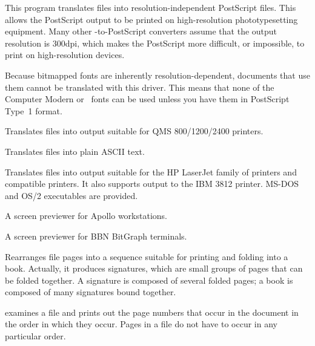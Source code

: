 
This program translates  files into resolution-independent 
PostScript files.  This allows the PostScript output to be printed on
high-resolution phototypesetting equipment.  Many other 
-to-PostScript converters assume that the output resolution is 
300dpi, which makes the PostScript more difficult, or impossible, to print
on high-resolution devices.

Because bitmapped fonts are inherently resolution-dependent, documents
that use them cannot be translated with this driver.  This means
that none of the Computer Modern or \AmS\ fonts can be used unless
you have them in PostScript Type~1 format.


Translates  files into output suitable for QMS 800/1200/2400 
printers.


Translates  files into plain ASCII text.

\newpage
{}

Translates  files into output suitable for the HP LaserJet
family of printers and compatible printers.  It also supports output
to the IBM 3812 printer.
MS-DOS and OS/2 executables are provided.


A screen previewer for Apollo workstations.


A screen previewer for BBN BitGraph terminals.


Rearranges  file pages into a sequence suitable for
printing and folding into a book.  Actually, it produces signatures,
which are small groups of pages that can be folded together.  A signature
is composed of several folded pages; a book is composed of many signatures
bound together.


 examines a  file and prints out the page numbers
that occur in the document in the order in which they occur.  Pages in a 
 file do not have to occur in any particular order.

